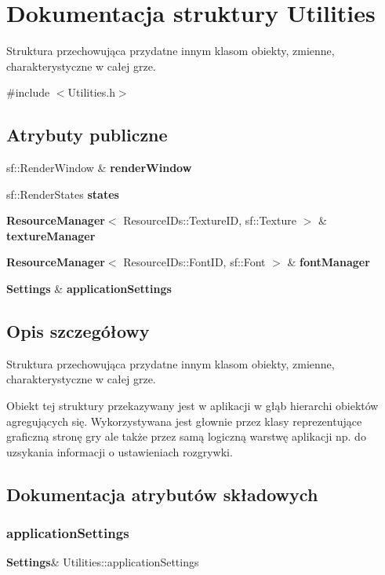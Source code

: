 \section{Dokumentacja struktury Utilities}
\label{struct_utilities}


Struktura przechowująca przydatne innym klasom obiekty, zmienne, charakterystyczne w całej grze.  




{\ttfamily \#include $<$Utilities.\+h$>$}

\subsection*{Atrybuty publiczne}
\begin{DoxyCompactItemize}
\item 
sf\+::\+Render\+Window \& \textbf{ render\+Window}
\item 
sf\+::\+Render\+States \textbf{ states}
\item 
\textbf{ Resource\+Manager}$<$ Resource\+I\+Ds\+::\+Texture\+ID, sf\+::\+Texture $>$ \& \textbf{ texture\+Manager}
\item 
\textbf{ Resource\+Manager}$<$ Resource\+I\+Ds\+::\+Font\+ID, sf\+::\+Font $>$ \& \textbf{ font\+Manager}
\item 
\textbf{ Settings} \& \textbf{ application\+Settings}
\end{DoxyCompactItemize}


\subsection{Opis szczegółowy}
Struktura przechowująca przydatne innym klasom obiekty, zmienne, charakterystyczne w całej grze. 

Obiekt tej struktury przekazywany jest w aplikacji w głąb hierarchi obiektów agregujących się. Wykorzystywana jest głownie przez klasy reprezentujące graficzną stronę gry ale także przez samą logiczną warstwę aplikacji np. do uzsykania informacji o ustawieniach rozgrywki. 

\subsection{Dokumentacja atrybutów składowych}
\mbox{\label{struct_utilities_ac7f2913636e02639a03e58ee3b33c241}} 
\subsubsection{applicationSettings}
{\footnotesize\ttfamily \textbf{ Settings}\& Utilities\+::application\+Settings}

